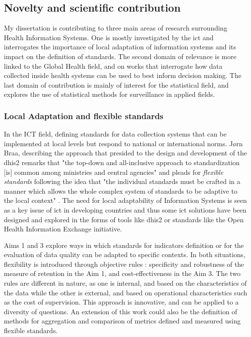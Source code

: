 \subsection{Novelty and scientific contribution}

My dissertation is contributing to three main areas of research surrounding Health Information Systems. One is mostly investigated by the \gls{ict} and interrogates the importance of local adaptation of information systems and its impact on the definition of standards. The second domain of relevance is more linked to the Global Health field, and on works that interrogate how data collected inside health systems can be used to best inform decision making. The last domain of contribution is mainly of interest for the statistical field, and explores the use of statistical methods for surveillance in applied fields.

\subsubsection{Local Adaptation and flexible standards}

In the ICT field, defining standards for data collection systems that can be implemented at local levels but respond to national or international norms. Jørn Braa, describing the approach that presided to the design and development of the \gls{dhis2} remarks that "the top-down and all-inclusive approach to standardization [is] common among ministries and central agencies" and pleads for \textit{flexible standards} following the idea that "the individual standards must be crafted in a manner which allows the whole complex system of standards to be adaptive to the local context" \citep{braa_developing_2007}. The need for local adaptability of Information Systems is seen as a key issue of \gls{ict} in developing countries \citep{macfarlane_harmonizing_2005,walsham_research_2006,walsham_foreword:_2007,jacucci_standardization_2006} and thus some \gls{ict} solutions have been designed and explored in the forms of tools like \gls{dhis2} or standards like the Open Health Information Exchange initiative.

Aims 1 and 3 explore ways in which standards for indicators definition or for the evaluation of data quality can be adapted to specific contexts. In both situations, flexibility is introduced through objective rules : specificity and robustness of the measure of retention in the Aim 1, and cost-effectiveness in the Aim 3. The two rules are different in nature, as one is internal, and based on the characteristics of the data while the other is external, and based on operational characteristics such as the cost of supervision. This approach is innovative, and can be applied to a diversity of questions. An extension of this work could also be the definition of methods for aggregation and comparison of metrics defined and measured using flexible standards.

